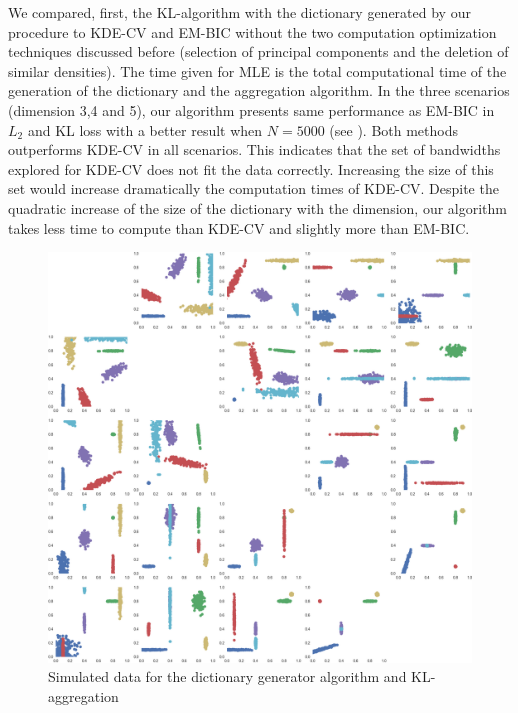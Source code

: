 We compared, first, the KL-algorithm with the dictionary generated by our procedure to KDE-CV and EM-BIC without the two computation optimization techniques discussed before (selection of principal components and the deletion of similar densities). The time given for MLE is the total computational time of the generation of the dictionary and the aggregation algorithm. In the three scenarios (dimension 3,4 and 5), our algorithm presents same performance as EM-BIC in $L_2$ and KL loss with a better result when $N=5000$ (see ). Both methods outperforms KDE-CV in all scenarios. This indicates that the set of bandwidths explored for KDE-CV does not fit the data correctly. Increasing the size of this set would increase dramatically the computation times of KDE-CV. Despite the quadratic increase of the size of the dictionary with the dimension, our algorithm takes less time to compute than KDE-CV and slightly more than EM-BIC.
\begin{figure}
\center
    \includegraphics[width=\textwidth]{./TeX_files/experiments_data.png}
    \caption{Simulated data for the dictionary generator algorithm and KL-aggregation}
    \label{fig:experiments_data}
\end{figure}

